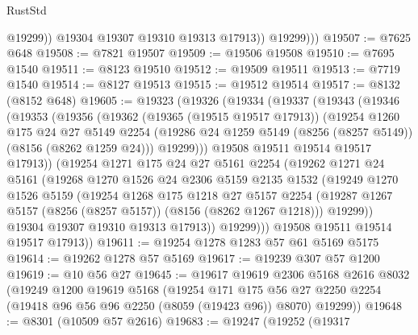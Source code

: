 \begin{lexlean}{RustStd}
\begin{coremodule}
{\begin{coremodule}
{{{{{{{{{{{{{{{{{{{{{{{{{{{{{{{{{{                  @19299))
              @19304
              @19307
              @19310
              @19313
              @17913))
          @19299)))
@19507 := @7625 @648
@19508 := @7821 @19507
@19509 := @19506 @19508
@19510 := @7695 @1540
@19511 := @8123 @19510
@19512 := @19509 @19511
@19513 := @7719 @1540
@19514 := @8127 @19513
@19515 := @19512 @19514
@19517 := @8132 (@8152 @648)
@19605 := @19323
    (@19326
      (@19334
        (@19337
          (@19343
            (@19346
              (@19353
                (@19356
                  (@19362
                    (@19365 (@19515 @19517 @17913))
                    (@19254
                      @1260
                      @175
                      @24
                      @27
                      @5149
                      @2254
                      (@19286 @24 @1259 @5149 (@8256 (@8257 @5149)) (@8156 (@8262 @1259 @24)))
                      @19299)))
                @19508
                @19511
                @19514
                @19517
                @17913))
            (@19254
              @1271
              @175
              @24
              @27
              @5161
              @2254
              (@19262
                @1271
                @24
                @5161
                (@19268
                  @1270
                  @1526
                  @24
                  @2306
                  @5159
                  @2135
                  @1532
                  (@19249
                    @1270
                    @1526
                    @5159
                    (@19254
                      @1268
                      @175
                      @1218
                      @27
                      @5157
                      @2254
                      (@19287 @1267 @5157 (@8256 (@8257 @5157)) (@8156 (@8262 @1267 @1218)))
                      @19299))
                  @19304
                  @19307
                  @19310
                  @19313
                  @17913))
              @19299)))
        @19508
        @19511
        @19514
        @19517
        @17913))
@19611 := @19254 @1278 @1283 @57 @61 @5169 @5175
@19614 := @19262 @1278 @57 @5169
@19617 := @19239 @307 @57 @1200
@19619 := @10 @56 @27
@19645 := @19617
    @19619
    @2306
    @5168
    @2616
    @8032
    (@19249
      @1200
      @19619
      @5168
      (@19254
        @171
        @175
        @56
        @27
        @2250
        @2254
        (@19418 @96 @56 @96 @2250 (@8059 (@19423 @96)) @8070)
        @19299))
@19648 := @8301 (@10509 @57 @2616)
@19683 := @19247
    (@19252
      (@19317
}}}}}}}}}}}}}}}}}}}}}}}}}}}}}}}}}}
\end{coremodule}}
\end{coremodule}
\end{lexlean}
